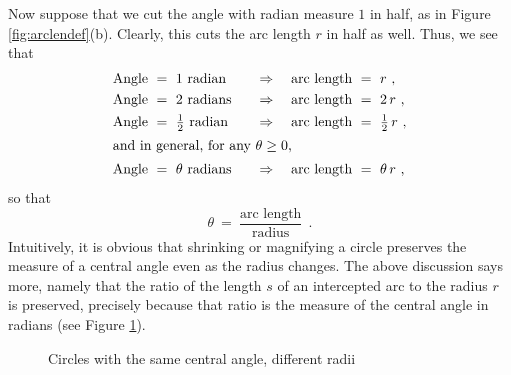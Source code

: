 Now suppose that we cut the angle with radian measure $1$ in half, as in Figure
\ref{fig:arclendef}(b).
Clearly, this cuts the arc length $r$ in half as well. Thus, we see that
\begin{alignat*}{4}
 \text{Angle} ~&=~ 1~\text{radian} \quad&\Rightarrow\quad \text{arc length} ~&=~ r ~,\\
 \text{Angle} ~&=~ 2~\text{radians} \quad&\Rightarrow\quad \text{arc length} ~&=~ 2\,r ~,\\
 \text{Angle} ~&=~ \tfrac{1}{2}~\text{radian} \quad&\Rightarrow\quad \text{arc length} ~&=~
  \tfrac{1}{2}\,r ~,\\
 \intertext{and in general, for any $\theta \ge 0$,}
 \text{Angle} ~&=~ \theta~\text{radians} \quad&\Rightarrow\quad \text{arc length} ~&=~ \theta\,r ~,
\end{alignat*}
so that
\begin{displaymath}
 \theta ~=~ \frac{\text{arc length}}{\text{radius}} ~~.
\end{displaymath}
\newpage
Intuitively, it is obvious that shrinking or magnifying a circle preserves the measure of a
central angle even as the radius changes. The above discussion says more, namely that the ratio
of the length $s$ of an intercepted arc to the radius $r$ is preserved, precisely because that
ratio is the measure of the central angle in radians (see Figure \ref{fig:radianratio}).

\begin{figure}[h]
 \centering
 \qquad\qquad\qquad
 \vspace{-1mm}
 \caption[]{\quad Circles with the same central angle, different radii}
 \label{fig:radianratio}
\end{figure}

